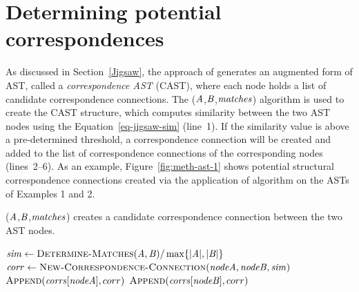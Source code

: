 \section{Determining potential correspondences}  \label{jigsaw-corr}

As discussed in Section~\ref{Jigsaw}, the approach of \citet{2008:fse:cottrell} generates an augmented form of AST, called a \emph{correspondence AST} (CAST), where each node holds a list of candidate correspondence connections. The ($\mathit{A}$,$\mathit{B}$,$\mathit{matches}$) algorithm is used to create the CAST structure, which computes similarity between the two AST nodes using the Equation~\ref{eq-jigsaw-sim} (line~1). If the similarity value is above a pre-determined threshold, a correspondence connection will be created and added to the list of correspondence connections of the corresponding nodes (lines~2--6). As an example, Figure~\ref{fig:meth-ast-1} shows potential structural correspondence connections created via the application of  algorithm on the ASTs of Examples 1 and 2.


\begin{algorithm}
  \caption{($\mathit{A}$,$\mathit{B}$,$\mathit{matches}$) creates a candidate correspondence connection between the two AST nodes.}
  \label{alg:ccc}
  \begin{algorithmic}[1]
  \DeterminePotentialCorrespondences
\State $\mathit{sim} \gets \textsc{Determine-Matches}(\mathit{A},\mathit{B})/\max\{{|\mathit{A}|, |\mathit{B}|}\}$	
 		\State $\mathit{corr} \gets \textsc{New-Correspondence-Connection}(\mathit{nodeA},\mathit{nodeB},\mathit{sim})$	
 \State $\textsc{Append}(\mathit{corrs}[\mathit{nodeA}],corr)$	
 \State $\textsc{Append}(\mathit{corrs}[\mathit{nodeB}],corr)$
 		\EndIf 		


	
  \end{algorithmic}
\end{algorithm}




